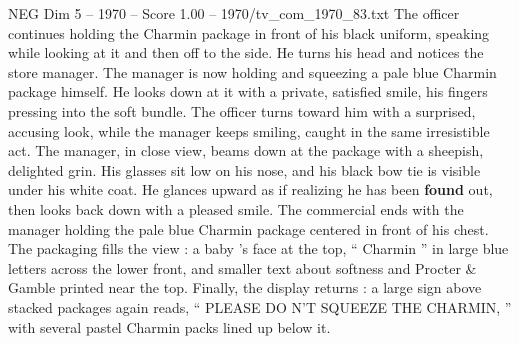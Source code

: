 \begin{textsample}{NEG Dim 5 – 1970 – Score 1.00 – 1970/tv\_com\_1970\_83.txt}
The officer continues holding the Charmin package in front of his black uniform, speaking while looking at it and then off to the side.
He turns his head and notices the store manager.
The manager is now holding and squeezing a pale blue Charmin package himself.
He looks down at it with a private, satisfied smile, his fingers pressing into the soft bundle.
The officer turns toward him with a surprised, accusing look, while the manager keeps smiling, caught in the same irresistible act.
The manager, in close view, beams down at the package with a sheepish, delighted grin.
His glasses sit low on his nose, and his black bow tie is visible under his white coat.
He glances upward as if realizing he has been \textbf{found} out, then looks back down with a pleased smile.
The commercial ends with the manager holding the pale blue Charmin package centered in front of his chest.
The packaging fills the view : a baby ’s face at the top, “ Charmin ” in large blue letters across the lower front, and smaller text about softness and Procter \& Gamble printed near the top.
Finally, the display returns : a large sign above stacked packages again reads, “ PLEASE DO N’T SQUEEZE THE CHARMIN, ” with several pastel Charmin packs lined up below it.

\end{textsample}
